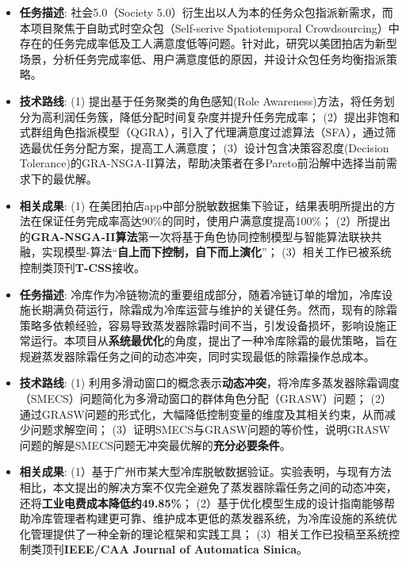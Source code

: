 \documentclass{resume}
\begin{document}
\vspace{1pt}

\begin{itemize}[itemsep=0.5ex]
  \item \textbf{任务描述}: 
    社会5.0（Society 5.0）衍生出以人为本的任务众包指派新需求，而本项目聚焦于自助式时空众包（Self-serive Spatiotemporal Crowdsourcing）中存在的任务完成率低及工人满意度低等问题。针对此，研究以美团拍店为新型场景，分析任务完成率低、用户满意度低的原因，并设计众包任务均衡指派策略。
  \item \textbf{技术路线}: 
    (1) 提出基于任务聚类的角色感知(Role Awareness)方法，将任务划分为高利润任务簇，降低分配时间复杂度并提升任务完成率；
    (2）提出非饱和式群组角色指派模型（QGRA），引入了代理满意度过滤算法（SFA），通过筛选最优任务分配方案，提高工人满意度；
    (3）设计包含决策容忍度(Decision Tolerance)的GRA-NSGA-II算法，帮助决策者在多Pareto前沿解中选择当前需求下的最优解。
  \item \textbf{相关成果}: 
    (1) 在美团拍店app中部分脱敏数据集下验证，结果表明所提出的方法在保证任务完成率高达90\%的同时，使用户满意度提高100\%；
    (2）所提出的\textbf{GRA-NSGA-II算法}第一次将基于角色协同控制模型与智能算法联袂共融，实现模型-算法“\textbf{自上而下控制，自下而上演化}”；
    (3）相关工作已被系统控制类顶刊\textbf{T-CSS}接收。
\end{itemize}

\vspace{1pt}

\begin{itemize}[itemsep=0.5ex]
  \item \textbf{任务描述}: 
    冷库作为冷链物流的重要组成部分，随着冷链订单的增加，冷库设施长期满负荷运行，除霜成为冷库运营与维护的关键任务。然而，现有的除霜策略多依赖经验，容易导致蒸发器除霜时间不当，引发设备损坏，影响设施正常运行。本项目从\textbf{系统最优化}的角度，提出了一种冷库除霜的最优策略，旨在规避蒸发器除霜任务之间的动态冲突，同时实现最低的除霜操作总成本。
  \item \textbf{技术路线}: 
    (1) 利用多滑动窗口的概念表示\textbf{动态冲突}，将冷库多蒸发器除霜调度（SMECS）问题简化为多滑动窗口的群体角色分配（GRASW）问题；
    (2）通过GRASW问题的形式化，大幅降低控制变量的维度及其相关约束，从而减少问题求解空间；
    (3）证明SMECS与GRASW问题的等价性，说明GRASW问题的解是SMECS问题无冲突最优解的\textbf{充分必要条件}。
  \item \textbf{相关成果}: 
    (1）基于广州市某大型冷库脱敏数据验证。实验表明，与现有方法相比，本文提出的解决方案不仅完全避免了蒸发器除霜任务之间的动态冲突，还将\textbf{工业电费成本降低约49.85\%}；
    (2）基于优化模型生成的设计指南能够帮助冷库管理者构建更可靠、维护成本更低的蒸发器系统，为冷库设施的系统优化管理提供了一种全新的理论框架和实践工具；
    (3）相关工作已投稿至系统控制类顶刊\textbf{IEEE/CAA Journal of Automatica Sinica}。
\end{itemize}
\end{document}
